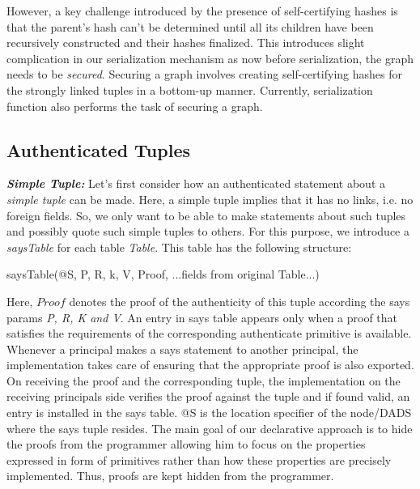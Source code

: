 However, a key challenge introduced by the presence of self-certifying hashes is that the parent's hash can't be determined until all its children have been recursively constructed and their hashes finalized. This introduces slight complication in our serialization mechanism as now before serialization, the graph needs to be {\em secured}. {Securing} a graph involves creating self-certifying hashes for the strongly linked tuples in a bottom-up manner. Currently, serialization function also performs the task of securing a graph.


\subsection{Authenticated Tuples}

\noindent\textit{\textbf{Simple Tuple:}} Let's first consider how an authenticated statement about a {\em simple tuple} can be made. Here, a simple tuple implies that it has no links, i.e. no foreign fields. So, we only want to be able to make statements about such tuples and possibly quote such simple tuples to others. For this purpose, we introduce a {\em saysTable} for each table {\em Table}. This table has the following structure:

\begin{center}
saysTable(@S, P, R, k, V, Proof, ...fields from original Table...)
\end{center}


Here, $Proof$ denotes the proof of the authenticity of this tuple according the says params {\em P, R, K and V}. An entry in says table appears only when a proof that satisfies the requirements of the corresponding authenticate primitive is available. Whenever a principal makes a says statement to another principal, the implementation takes care of ensuring that the appropriate proof is also exported. On receiving the proof and the corresponding tuple, the implementation on the receiving principals side verifies the proof against the tuple and if found valid, an entry is installed in the says table. @S is the location specifier of the node/DADS where the says tuple resides. The main goal of our declarative approach is to hide the proofs from the programmer allowing him to focus on the properties expressed in form of primitives rather than how these properties are precisely implemented. Thus, proofs are kept hidden from the programmer. 

